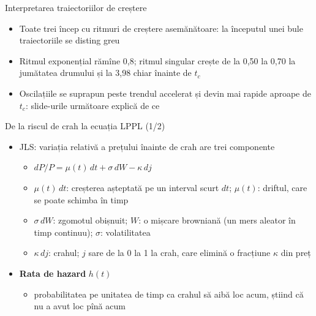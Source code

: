\begin{frame}{Interpretarea traiectoriilor de creștere}
\itemsize{\small}
\begin{itemize}
    \item Toate trei încep cu ritmuri de creștere asemănătoare: la începutul unei bule traiectoriile se disting greu
    \item Ritmul exponențial rămîne 0,8; ritmul singular crește de la 0{,}50 la 0{,}70 la jumătatea drumului și la 3{,}98 chiar înainte de $t_c$
    \item Oscilațiile se suprapun peste trendul accelerat și devin mai rapide aproape de $t_c$: slide-urile următoare explică de ce
\end{itemize}
\end{frame}

\begin{frame}{De la riscul de crah la ecuația LPPL (1/2)}
\itemsize{\footnotesize}
\begin{itemize}
    \item JLS: variația relativă a prețului înainte de crah are trei componente
    \begin{itemize}
        \item $dP/P = \mu(t)\,dt + \sigma\,dW - \kappa\, dj$
        \item $\mu(t)\,dt$: creșterea așteptată pe un interval scurt $dt$; $\mu(t)$: driftul, care se poate schimba în timp
        \item $\sigma\,dW$: zgomotul obișnuit; $W$: o mișcare browniană (un mers aleator în timp continuu); $\sigma$: volatilitatea
        \item $\kappa\, dj$: crahul; $j$ sare de la 0 la 1 la crah, care elimină o fracțiune $\kappa$ din preț
    \end{itemize}
    \item \textbf{Rata de hazard} $h(t)$
    \begin{itemize}
        \item probabilitatea pe unitatea de timp ca crahul să aibă loc acum, știind că nu a avut loc pînă acum
    \end{itemize}
\end{itemize}
\end{frame}

